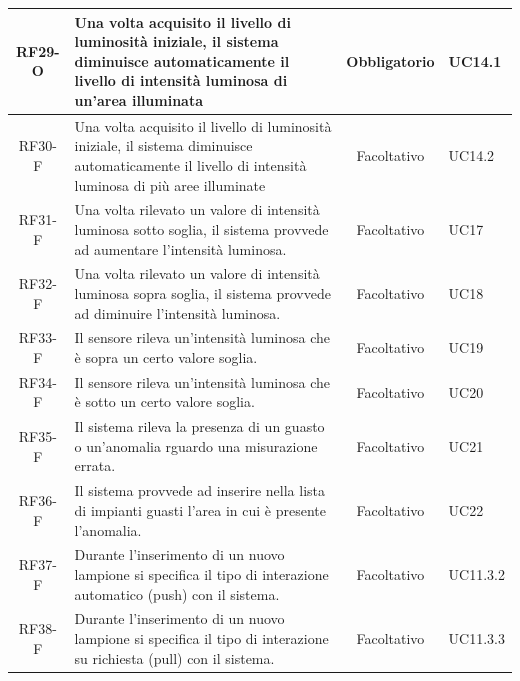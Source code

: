 \documentclass[a4paper, 12pt]{article}
\begin{document}
\begin{longtable}{|c|p{7cm}|c|p{4cm}|}
    \hline
    RF29-O          & Una volta acquisito il livello di luminosità iniziale, il sistema diminuisce automaticamente il livello di intensità luminosa di un'area illuminata           & Obbligatorio       & UC14.1         \\
    \hline
    RF30-F          & Una volta acquisito il livello di luminosità iniziale, il sistema diminuisce automaticamente il livello di intensità luminosa di più aree illuminate          & Facoltativo        & UC14.2         \\
    \hline
    RF31-F          & Una volta rilevato un valore di intensità luminosa sotto soglia, il sistema provvede ad aumentare l'intensità luminosa.                                       & Facoltativo        & UC17           \\
    \hline
    RF32-F          & Una volta rilevato un valore di intensità luminosa sopra soglia, il sistema provvede ad diminuire l'intensità luminosa.                                       & Facoltativo        & UC18           \\
    \hline
    RF33-F          & Il sensore rileva un'intensità luminosa che è sopra un certo valore soglia.                                                                                   & Facoltativo        & UC19           \\
    \hline
    RF34-F          & Il sensore rileva un'intensità luminosa che è sotto un certo valore soglia.                                                                                   & Facoltativo        & UC20           \\
    \hline
    RF35-F          & Il sistema rileva la presenza di un guasto o un'anomalia rguardo una misurazione errata.                                                                      & Facoltativo        & UC21           \\
    \hline
    RF36-F          & Il sistema provvede ad inserire nella lista di impianti guasti l'area in cui è presente l'anomalia.                                                           & Facoltativo        & UC22           \\
    \hline
    RF37-F          & Durante l'inserimento di un nuovo lampione si specifica il tipo di interazione automatico (push) con il sistema.                                              & Facoltativo        & UC11.3.2       \\
    \hline
    RF38-F          & Durante l'inserimento di un nuovo lampione si specifica il tipo di interazione su richiesta (pull) con il sistema.                                            & Facoltativo        & UC11.3.3       \\

\end{longtable}
\end{document}
